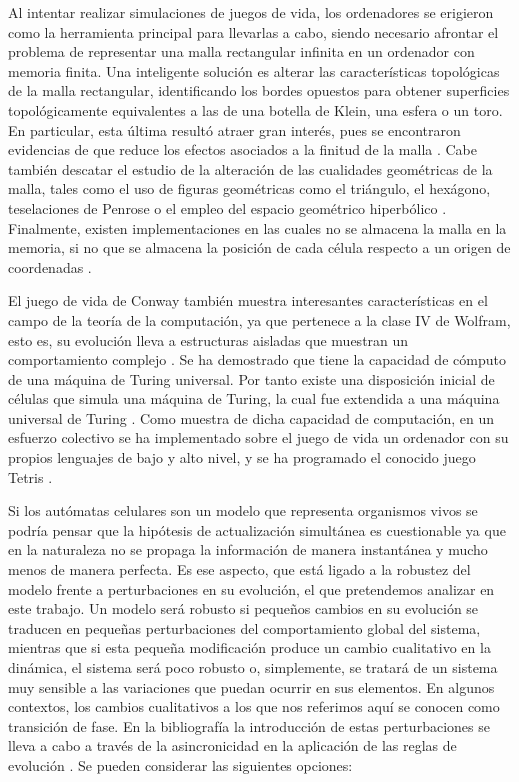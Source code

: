 \documentclass[../proyecto.tex]{book}
\begin{document}
Al intentar realizar simulaciones de juegos de vida, los ordenadores se erigieron como la herramienta principal para llevarlas a cabo, siendo necesario afrontar el problema de representar una malla rectangular infinita en un ordenador con memoria finita. Una inteligente solución es alterar las características topológicas de la malla rectangular, identificando los bordes opuestos para obtener superficies topológicamente equivalentes a las de una botella de Klein, una esfera o un toro. En particular, esta última resultó atraer gran interés, pues se encontraron evidencias de que reduce los efectos asociados a la finitud de la malla \cite{finitudMalla, finitudMalla2}. Cabe también descatar el estudio de la alteración de las cualidades geométricas de la malla, tales como el uso de figuras geométricas como el triángulo, el hexágono\cite{triangular}, teselaciones de Penrose \cite{penrose} o el empleo del espacio geométrico hiperbólico \cite{hiperbolico}. Finalmente, existen implementaciones en las cuales no se almacena la malla en la memoria, si no que se almacena la posición de cada célula respecto a un origen de coordenadas \cite{boardless}.

El juego de vida de Conway también muestra interesantes características en el campo de la teoría de la computación, ya que pertenece a la clase IV de Wolfram, esto es, su evolución lleva a estructuras aisladas que muestran un comportamiento complejo \cite{ccuatro, ccuatro2}. Se ha demostrado que tiene la capacidad de cómputo de una máquina de Turing universal. Por tanto existe una disposición inicial de células que simula una máquina de Turing, la cual fue extendida a una máquina universal de Turing \cite{turingUniversal,turing}. Como muestra de dicha capacidad de computación, en un esfuerzo colectivo se ha implementado sobre el juego de vida un ordenador con su propios lenguajes de bajo y alto nivel, y se ha programado el conocido juego Tetris \cite{tetris, logical}.

Si los autómatas celulares son un modelo que representa organismos vivos se podría pensar que la hipótesis de actualización simultánea es cuestionable ya que en la naturaleza no se propaga la información de manera instantánea y mucho menos de manera perfecta. Es ese aspecto, que está ligado a la robustez del modelo frente a perturbaciones en su evolución, el que pretendemos analizar en este trabajo. Un modelo será robusto si pequeños cambios en su evolución se traducen en pequeñas perturbaciones del comportamiento global del sistema, mientras que si esta pequeña modificación produce un cambio cualitativo en la dinámica, el sistema será poco robusto o, simplemente, se tratará de un sistema muy sensible a las variaciones que puedan ocurrir en sus elementos. En algunos contextos, los cambios cualitativos a los que nos referimos aquí se conocen como transición de fase. En la bibliografía la introducción de estas perturbaciones se lleva a cabo a través de la asincronicidad en la aplicación de las reglas de evolución \cite{asyncIntro}. Se pueden considerar las siguientes opciones:
\end{document}
